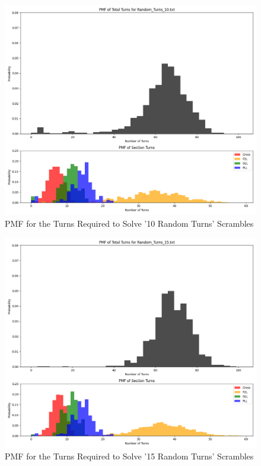\documentclass[12pt,letterpaper]{article}
\numberwithin{equation}{section}
\begin{document}
	\begin{figure}[H]
		\centering
		 \includegraphics[width=6in]{pmf_turns_10.png}
		 \caption{PMF for the Turns Required to Solve '10 Random Turns' Scrambles}
		 \label{fig:pmf_turns_10_plot}
	\end{figure}
	
	\begin{figure}[H]
		\centering
		 \includegraphics[width=6in]{pmf_turns_15.png}
		 \caption{PMF for the Turns Required to Solve '15 Random Turns' Scrambles}
		 \label{fig:pmf_turns_15_plot}
	\end{figure}
	
\end{document}
